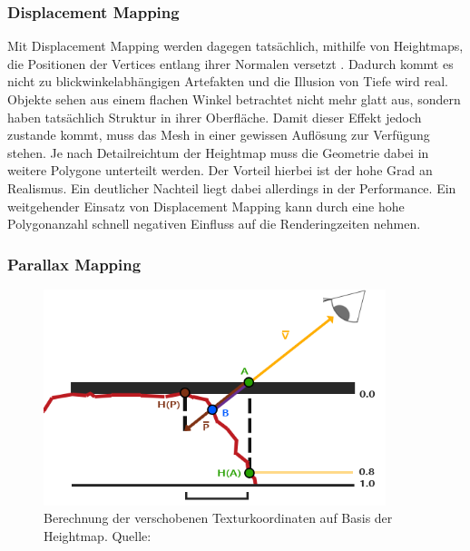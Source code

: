 \subsubsection{Displacement Mapping}
Mit Displacement Mapping werden dagegen tatsächlich, mithilfe von Heightmaps, die Positionen
der Vertices entlang ihrer Normalen versetzt \parencite{Cook1984,Cook1987}. Dadurch kommt es nicht zu blickwinkelabhängigen Artefakten
und die Illusion von Tiefe wird real. Objekte sehen aus einem flachen Winkel betrachtet nicht mehr
glatt aus, sondern haben tatsächlich Struktur in ihrer Oberfläche. Damit dieser Effekt jedoch zustande kommt,
muss das Mesh in einer gewissen Auflösung zur Verfügung stehen. Je nach Detailreichtum der Heightmap
muss die Geometrie dabei in weitere Polygone unterteilt werden. Der Vorteil hierbei ist der hohe
Grad an Realismus. Ein deutlicher Nachteil liegt dabei allerdings in der Performance.
Ein weitgehender Einsatz von Displacement Mapping kann durch eine hohe Polygonanzahl schnell
negativen Einfluss auf die Renderingzeiten nehmen. 


\subsubsection{Parallax Mapping}

\begin{figure}[!h]
	\centering
	\includegraphics[width=0.89\textwidth]{Grafiken/Basics/Mapping/parallax_mapping.png}
	\begin{footnotesize}
		\caption{Berechnung der verschobenen Texturkoordinaten auf Basis der Heightmap. Quelle: \parencite{LearnOpenGL:Parallax}}
		\label{fig:parallax}
	\end{footnotesize}
\end{figure}


